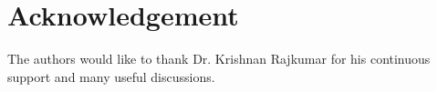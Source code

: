 \documentclass[conference]{IEEEtran}
\begin{document}
\section*{Acknowledgement}
The authors would like to thank Dr. Krishnan Rajkumar for his continuous support and many useful discussions.


%
%
%
\end{document}
